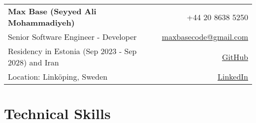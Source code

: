 \documentclass[a4paper,10pt]{article}
\makeatletter
\newcommand{\name}{Max Base (Seyyed Ali Mohammadiyeh)} %
\newcommand{\course}{Senior Software Engineer - Developer} %
\newcommand{\phone}{+44 20 8638 5250}%
\newcommand{\emailb}{maxbasecode@gmail.com} %
\newcommand{\github}{BaseMax} %
\newcommand{\website}{https://maxbase.org} %
\newcommand{\linkedin}{maxbase} %
\makeatother
\begin{document}
\selectfont

	\begin{tabularx}{\linewidth}{L r}
		\textbf{\LARGE \name} & \phone\\
		
		\course &  \href{mailto:\emailb}{\emailb}\\
		{Residency in Estonia (Sep 2023 - Sep 2028) and Iran} &  \href{https://github.com/\github}{GitHub} \\ %
		{Location: Linköping, Sweden} & \href{https://www.linkedin.com/in/\linkedin/}{LinkedIn}
	\end{tabularx}

\vspace{-2mm}


\iffalse
\section{\textbf{Summary}}
compiler programming developer developing test
go golang go language c# .net asp.net dotnet
typescript javascript react reactjs
js ts
sql
expressjs nestjs
\fi

\section{\textbf{Technical Skills}}
\end{document}
